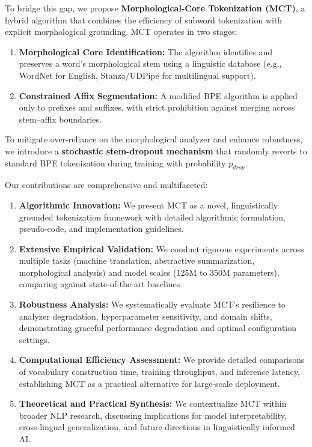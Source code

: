\documentclass[conference]{IEEEtran}
\begin{document}
To bridge this gap, we propose \textbf{Morphological-Core Tokenization (MCT)}, a hybrid algorithm that combines the efficiency of subword tokenization with explicit morphological grounding. MCT operates in two stages:
\begin{enumerate}
    \item \textbf{Morphological Core Identification:} The algorithm identifies and preserves a word's morphological stem using a linguistic database (e.g., WordNet for English, Stanza/UDPipe for multilingual support).
    \item \textbf{Constrained Affix Segmentation:} A modified BPE algorithm is applied only to prefixes and suffixes, with strict prohibition against merging across stem–affix boundaries.
\end{enumerate}

To mitigate over-reliance on the morphological analyzer and enhance robustness, we introduce a \textbf{stochastic stem-dropout mechanism} that randomly reverts to standard BPE tokenization during training with probability $p_{drop}$.

Our contributions are comprehensive and multifaceted:
\begin{enumerate}
    \item \textbf{Algorithmic Innovation:} We present MCT as a novel, linguistically grounded tokenization framework with detailed algorithmic formulation, pseudo-code, and implementation guidelines.
    \item \textbf{Extensive Empirical Validation:} We conduct rigorous experiments across multiple tasks (machine translation, abstractive summarization, morphological analysis) and model scales (125M to 350M parameters), comparing against state-of-the-art baselines.
    \item \textbf{Robustness Analysis:} We systematically evaluate MCT's resilience to analyzer degradation, hyperparameter sensitivity, and domain shifts, demonstrating graceful performance degradation and optimal configuration settings.
    \item \textbf{Computational Efficiency Assessment:} We provide detailed comparisons of vocabulary construction time, training throughput, and inference latency, establishing MCT as a practical alternative for large-scale deployment.
    \item \textbf{Theoretical and Practical Synthesis:} We contextualize MCT within broader NLP research, discussing implications for model interpretability, cross-lingual generalization, and future directions in linguistically informed AI.
\end{enumerate}
\end{document}
